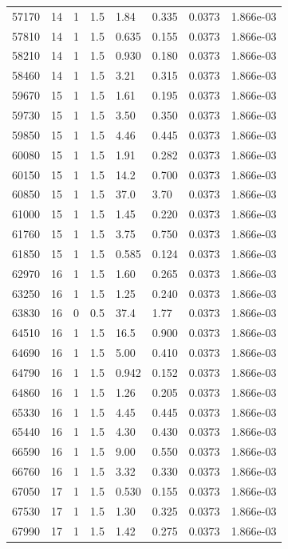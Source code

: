 \documentclass[preview]{standalone}
\begin{document}
{{{{{{\begin{tabular}{L{1.2cm}C{1.2cm} C{0.3cm}C{0.5cm} C{1.4cm}C{1.4cm} C{1.4cm}C{1.4cm}}
  57170  &    14  & 1     & 1.5 &  1.84  & 0.335  & 0.0373 &  1.866e-03   \\ 
  57810  &    14  & 1     & 1.5 &  0.635  & 0.155  & 0.0373 &  1.866e-03   \\ 
  58210  &    14  & 1     & 1.5 &  0.930  & 0.180  & 0.0373 &  1.866e-03   \\ 
  58460  &    14  & 1     & 1.5 &  3.21  & 0.315  & 0.0373 &  1.866e-03   \\ 
  59670  &    15  & 1     & 1.5 &  1.61  & 0.195  & 0.0373 &  1.866e-03   \\ 
  59730  &    15  & 1     & 1.5 &  3.50  & 0.350  & 0.0373 &  1.866e-03   \\ 
  59850  &    15  & 1     & 1.5 &  4.46  & 0.445  & 0.0373 &  1.866e-03   \\ 
  60080  &    15  & 1     & 1.5 &  1.91  & 0.282  & 0.0373 &  1.866e-03   \\ 
  60150  &    15  & 1     & 1.5 &  14.2  & 0.700  & 0.0373 &  1.866e-03   \\ 
  60850  &    15  & 1     & 1.5 &  37.0  & 3.70  & 0.0373 &  1.866e-03   \\ 
  61000  &    15  & 1     & 1.5 &  1.45  & 0.220  & 0.0373 &  1.866e-03   \\ 
  61760  &    15  & 1     & 1.5 &  3.75  & 0.750  & 0.0373 &  1.866e-03   \\ 
  61850  &    15  & 1     & 1.5 &  0.585  & 0.124  & 0.0373 &  1.866e-03   \\ 
  62970  &    16  & 1     & 1.5 &  1.60  & 0.265  & 0.0373 &  1.866e-03   \\ 
  63250  &    16  & 1     & 1.5 &  1.25  & 0.240  & 0.0373 &  1.866e-03   \\ 
  63830  &    16  & 0     & 0.5 &  37.4  & 1.77  & 0.0373 &  1.866e-03   \\ 
  64510  &    16  & 1     & 1.5 &  16.5  & 0.900  & 0.0373 &  1.866e-03   \\ 
  64690  &    16  & 1     & 1.5 &  5.00  & 0.410  & 0.0373 &  1.866e-03   \\ 
  64790  &    16  & 1     & 1.5 &  0.942  & 0.152  & 0.0373 &  1.866e-03   \\ 
  64860  &    16  & 1     & 1.5 &  1.26  & 0.205  & 0.0373 &  1.866e-03   \\ 
  65330  &    16  & 1     & 1.5 &  4.45  & 0.445  & 0.0373 &  1.866e-03   \\ 
  65440  &    16  & 1     & 1.5 &  4.30  & 0.430  & 0.0373 &  1.866e-03   \\ 
  66590  &    16  & 1     & 1.5 &  9.00  & 0.550  & 0.0373 &  1.866e-03   \\ 
  66760  &    16  & 1     & 1.5 &  3.32  & 0.330  & 0.0373 &  1.866e-03   \\ 
  67050  &    17  & 1     & 1.5 &  0.530  & 0.155  & 0.0373 &  1.866e-03   \\ 
  67530  &    17  & 1     & 1.5 &  1.30  & 0.325  & 0.0373 &  1.866e-03   \\ 
  67990  &    17  & 1     & 1.5 &  1.42  & 0.275  & 0.0373 &  1.866e-03   \\ 
\hline 
\end{tabular} 

}}}}}}
\end{document}
